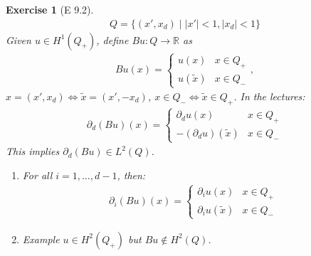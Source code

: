 \documentclass{report}
\theoremstyle{tommy}
\newtheorem{ex}[defn]{Exercise}
\begin{document}
  \begin{ex}[E 9.2]
    \begin{align*}
      Q = \{(x', x_d) \mid |x'| < 1, |x_d| < 1\}
    \end{align*}
    Given \(u \in H^1(Q_+)\), define \(Bu: Q \to \mathbb{R}\) as 
    \begin{align*}
      Bu (x) = \begin{cases}
        u(x) & x \in Q_+ \\ u(\tilde x) & x \in Q_-
      \end{cases},
    \end{align*}
    \(x = (x', x_d) \Leftrightarrow \tilde x = (x', -x_d)\), \(x \in Q_- \Leftrightarrow \tilde x \in Q_+\). In the lectures:
    \begin{align*}
      \partial_d(Bu)(x) = \begin{cases}
        \partial_d u(x) & x \in Q_+ \\ -(\partial_d u)(\tilde x) & x \in Q_-
      \end{cases}
    \end{align*}
    This implies \(\partial_d (Bu) \in L^2(Q)\).
    \begin{enumerate}
      \item For all \(i=1,\dots,d-1\), then:
      \begin{align*}
        \partial_i (Bu)(x) = \begin{cases}
          \partial_i u(x) & x \in Q_+ \\ \partial_i u(\tilde x) & x \in Q_-
        \end{cases}
      \end{align*}
      \item Example \(u \in H^2(Q_+)\) but \(Bu \notin H^2(Q)\).
    \end{enumerate}
  \end{ex}
\end{document}
